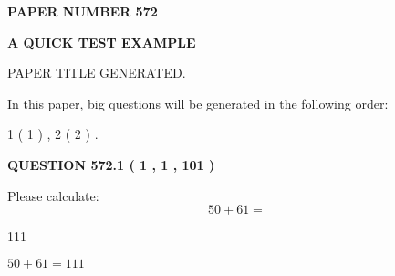 \documentclass[12pt]{article}
\begin{document}
   
   
   
\newpage 
\setcounter{page}{ 
   572001 } 
   
   
   
   
 {\textbf{ \Large{ PAPER NUMBER  572  }}}
   
   
\vspace{0.2in}
   
   
   
   
   
   
   
   
 \vspace{0.2in}
{\LARGE {\textbf{ A QUICK TEST EXAMPLE}}}
   
   
 PAPER TITLE GENERATED.
   
   
   
\vspace{0.2in}
   
In this paper, big questions will be generated in the following order: 
   
   
   1 ( 1 )
 ,
   2 ( 2 )
 .
  
\vspace{0.2in}
  
{\textbf{\Large{QUESTION
572.1 
 ( 1 , 1 , 101 )
}}}
  
  
 
Please calculate:
\begin{equation}
50 +  %
61 = \nonumber
\end{equation}
 
 
 
\noindent{}
 
 

111
 
 
\noindent{}
 
 

 
 
 
\noindent{}
 
 

$ %
50 +  %
61=   %
111$
 
 
\noindent{}
 
 

 
   
\end{document}
